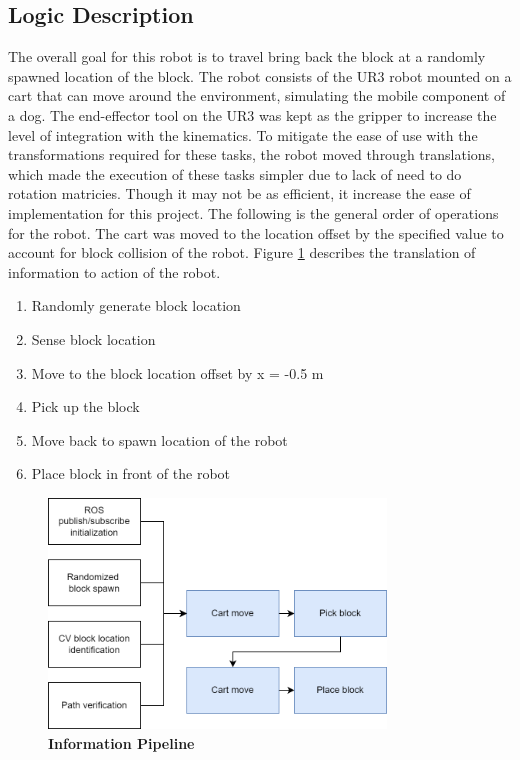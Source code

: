     \subsection{Logic Description}
    
        The overall goal for this robot is to travel bring back the block at a randomly spawned location of the block. The robot consists of the UR3 robot mounted on a cart that can move around the environment, simulating the mobile component of a dog. The end-effector tool on the UR3 was kept as the gripper to increase the level of integration with the kinematics. To mitigate the ease of use with the transformations required for these tasks, the robot moved through translations, which made the execution of these tasks simpler due to lack of need to do rotation matricies. Though it may not be as efficient, it increase the ease of implementation for this project. The following is the general order of operations for the robot. The cart was moved to the location offset by the specified value to account for block collision of the robot. Figure \ref{fig:pipeline} describes the translation of information to action of the robot. 
        
        \begin{enumerate}
            \item Randomly generate block location
            \item Sense block location
            \item Move to the block location offset by x = -0.5 m
            \item Pick up the block
            \item Move back to spawn location of the robot
            \item Place block in front of the robot
        \end{enumerate}
        
        \begin{figure}[h]
        	\begin{center}
        	\includegraphics[width=0.8\textwidth]{pictures/information piplien.drawio.png}
        	\caption{\textbf{Information Pipeline}}
        	\label{fig:pipeline}
        	\end{center}
        \end{figure}        
        
